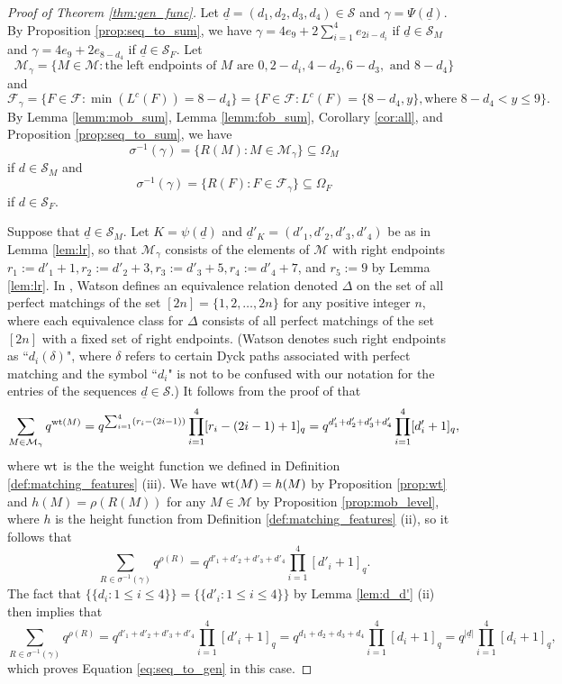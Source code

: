 \documentclass[10pt,a4paper]{amsart}
\numberwithin{equation}{section}
\newcommand{\lc}{L^c}
\newcommand{\mset}[1]{\{\!\{#1\}\!\}}
\newcommand{\seqd}{\underline{d}}
\newcommand{\calf}{\mathcal{F}}
\newcommand{\calm}{\mathcal{M}}
\newcommand{\cals}{\mathcal{S}}
\newcommand{\fob}{\Omega_F}
\newcommand{\mob}{\Omega_M}
\DeclareMathOperator{\wt}{\rm{wt}}
\newcommand{\se}{\subseteq}
\newcommand{\inverse}{^{-1}}
\newcommand{\abs}[1]{\lvert #1 \rvert}
\begin{document}
\begin{proof}[Proof of Theorem \ref{thm:gen_func}]
  Let $\seqd=(d_1,d_2,d_3,d_4)\in \cals$ and $\gamma=\Psi(\seqd)$.
  By Proposition \ref{prop:seq_to_sum}, we have
  $\gamma=4e_9+2\sum_{i=1}^4e_{2i-d_i}$ if $\seqd\in \cals_M$
  and $\gamma=4e_9+2e_{8-d_4}$ if $\seqd\in \cals_F$.  
   Let 
  \[
       \calm_\gamma= \{M\in \calm: \text{the left endpoints of 
    $M$ are $0, 2-d_i, 4-d_2, 6-d_3,$ and $8-d_4$}\}
  \]
 and  
  \[
    \calf_\gamma=\{F\in \calf: \min(\lc(F))=8-d_4\}=\{F\in \calf: \lc(F)=\{8-d_4,y\},
    \text{where $8-d_4<y\le 9$}\}.
  \]
 By Lemma \ref{lemm:mob_sum}, Lemma \ref{lemm:fob_sum}, Corollary \ref{cor:all},
  and Proposition \ref{prop:seq_to_sum}, we have 
 \[
\sigma\inverse(\gamma)=\{R(M): M\in \calm_\gamma\}\se \mob\]
if $d\in \cals_M$
and 
\[
    \sigma\inverse(\gamma)=\{R(F): F\in \calf_\gamma\}\se \fob
 \] 
 if $d\in \cals_F$.



Suppose that $\seqd\in \cals_M$. Let $K=\psi(\seqd)$ and $\seqd'_K=(d'_1,d'_2,d'_3,d'_4)$ be
as in Lemma \ref{lem:lr}, so that $\calm_\gamma$ consists of the elements of
$\calm$ with right endpoints $r_1:=d'_1+1, r_2:=d'_2+3, r_3:=d'_3+5,
r_4:=d'_4+7$, and $r_5:=9$ by Lemma \ref{lem:lr}. In \cite[Section
3.3]{watson14}, Watson defines an equivalence relation denoted $\Delta$ on the
set of all perfect matchings of the set $[2n]=\{1,2,\dots, 2n\}$ for any
positive integer $n$, where each equivalence class for $\Delta$ consists of all
perfect matchings of the set $[2n]$ with a fixed set of right endpoints. (Watson
denotes such right endpoints as ``$d_i(\delta)$", where $\delta$ refers to
certain Dyck paths associated with perfect matching and the symbol ``$d_i$" is
not to be confused with our notation for the entries of the sequences $\seqd\in
\cals$.) It follows from the proof of \cite[Theorem 1]{watson14} that 
    \[
      \sum_{M\in \calm_\gamma} q^{\wt(M)}=q^{\sum_{i=1}^4
      (r_i-(2i-1))}\prod_{i=1}^4 [r_i-(2i-1)+1]_q=q^{d'_1+d'_2+d'_3+d'_4}\prod_{i=1}^4 
  [d'_i+1]_q,
    \]
where $\wt$ is the the weight function we defined in Definition
\ref{def:matching_features} (iii). We have $\wt(M)=h(M)$ by Proposition
\ref{prop:wt} and $h(M)=\rho(R(M))$ for any $M\in \calm$ by Proposition
\ref{prop:mob_level}, where $h$ is the height function from Definition
\ref{def:matching_features} (ii), so it follows that \[ \sum_{R\in
\sigma\inverse(\gamma)}q^{\rho(R)} = q^{d'_1+d'_2+d'_3+d'_4}\prod_{i=1}^4
[d'_i+1]_q. \] The fact that $\mset{d_i:1\le i\le 4}=\mset{d'_i: 1\le i\le 4}$
by Lemma \ref{lem:d_d'} (ii) then implies that \[ \sum_{R\in
  \sigma\inverse(\gamma)}q^{\rho(R)} = q^{d'_1+d'_2+d'_3+d'_4}\prod_{i=1}^4
  [d'_i+1]_q= q^{d_1+d_2+d_3+d_4}\prod_{i=1}^4
[d_i+1]_q=q^{\abs{\seqd}}\prod_{i=1}^4 [d_i+1]_q, \] which proves Equation
\eqref{eq:seq_to_gen} in this case. 


\end{proof}
\end{document}
